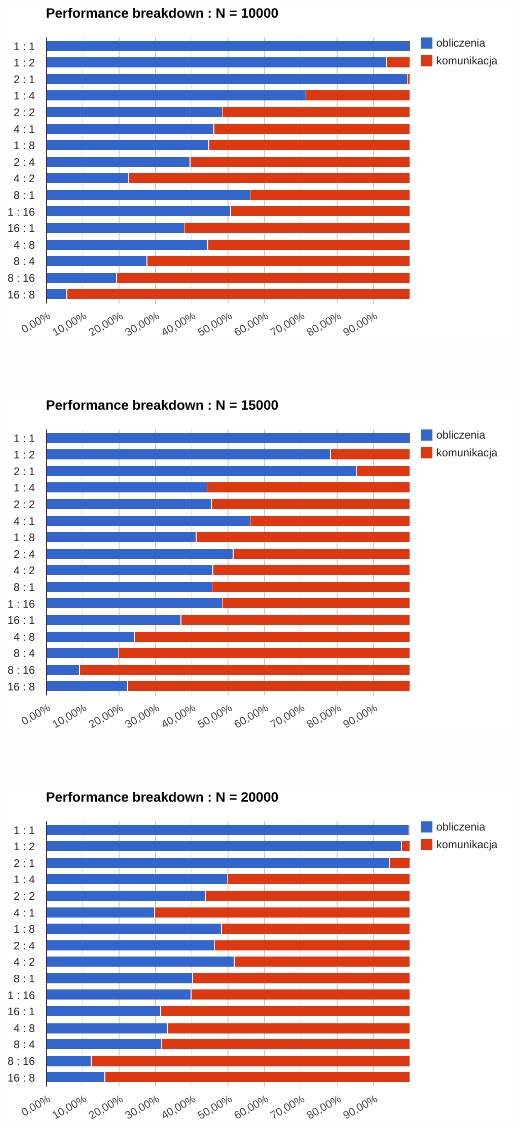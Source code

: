 \documentclass[paper=a4, fontsize=11pt]{scrartcl}	%
\numberwithin{equation}{section}		%
\numberwithin{figure}{section}			%
\numberwithin{table}{section}				%
\begin{document}
\includegraphics[width=135mm]{report/breakdown-10000.pdf} \\ \ \\ \ \\ \ \\

\includegraphics[width=135mm]{report/breakdown-15000.pdf} \\ \ \\ \ \\ \ \\

\includegraphics[width=135mm]{report/breakdown-20000.pdf} \\ \ \\ \ \\ \ \\
\end{document}
